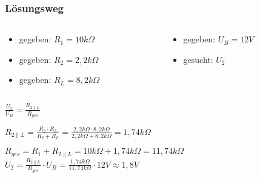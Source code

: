 \begin{frame}
\frametitle{Lösungsweg}
\begin{columns}
    \begin{column}{0.48\textwidth}
    \begin{itemize}
  \item gegeben: $R_1 = 10kΩ$
  \item gegeben: $R_2 = 2,2kΩ$
  \item gegeben: $R_L = 8,2kΩ$
  \end{itemize}

    \end{column}
   \begin{column}{0.48\textwidth}
       \begin{itemize}
  \item gegeben: $U_B = 12V$
  \item gesucht: $U_2$
  \end{itemize}

   \end{column}
\end{columns}
    \pause
    $\frac{U_2}{U_B} = \frac{R_{2\parallel L}}{R_{ges}}$

$R_{2\parallel L} = \frac{R_2 \cdot R_L}{R_2 + R_L} = \frac{2,2kΩ \cdot 8,2kΩ}{2,2kΩ + 8,2kΩ} = 1,74kΩ$

$R_{ges} = R_1 + R_{2\parallel L} = 10kΩ + 1,74kΩ = 11,74kΩ$
    \pause
    $U_2 = \frac{R_{2\parallel L}}{R_{ges}} \cdot U_B = \frac{1,74kΩ}{11,74kΩ} \cdot 12V \approx 1,8V$



\end{frame}%
